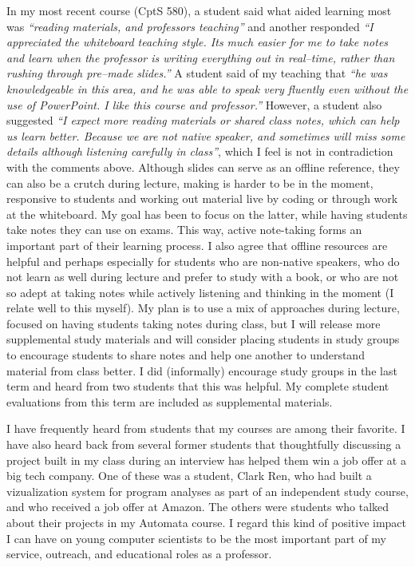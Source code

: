 \documentclass[12pt]{article}
\begin{document}
In my most recent course (CptS 580), a student said what aided learning most was \emph{``reading materials, and professors teaching''} and another responded \emph{``I appreciated the whiteboard teaching style. Its much easier for me to take notes and learn when the professor is writing everything out in real–time, rather than rushing through pre–made slides.''} A student said of my teaching that \emph{``he was knowledgeable in this area, and he was able to speak very fluently even without the use of PowerPoint. I like this course and professor.''} However, a student also suggested \emph{``I expect more reading materials or shared class notes, which can help us learn better. Because we are not native speaker, and sometimes will miss some details although listening carefully in class''}, which I feel is not in contradiction with the comments above. Although slides can serve as an offline reference, they can also be a crutch during lecture, making is harder to be in the moment, responsive to students and working out material live by coding or through work at the whiteboard. My goal has been to focus on the latter, while having students take notes they can use on exams. This way, active note-taking forms an important part of their learning process. I also agree that offline resources are helpful and perhaps especially for students who are non-native speakers, who do not learn as well during lecture and prefer to study with a book, or who are not so adept at taking notes while actively listening and thinking in the moment (I relate well to this myself). My plan is to use a mix of approaches during lecture, focused on having students taking notes during class, but I will release more supplemental study materials and will consider placing students in study groups to encourage students to share notes and help one another to understand material from class better. I did (informally) encourage study groups in the last term and heard from two students that this was helpful. My complete student evaluations from this term are included as supplemental materials.

I have frequently heard from students that my courses are among their favorite. I have also heard back from several former students that thoughtfully discussing a project built in my class during an interview has helped them win a job offer at a big tech company. One of these was a student, Clark Ren, who had built a vizualization system for program analyses as part of an independent study course, and who received a job offer at Amazon. The others were students who talked about their projects in my Automata course. I regard this kind of positive impact I can have on young computer scientists to be the most important part of my service, outreach, and educational roles as a professor.
\end{document}
